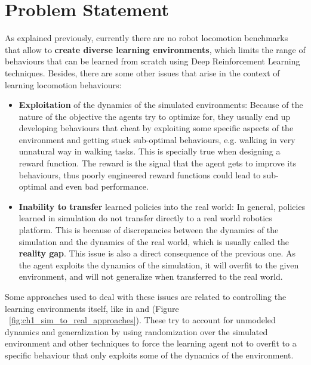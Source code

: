 \section{Problem Statement}
\label{sec:problem}

As explained previously, currently there are no robot locomotion benchmarks that allow
to \textbf{create diverse learning environments}, which limits the range of behaviours that can be learned
from scratch using Deep Reinforcement Learning techniques. Besides, there are some other issues 
that arise in the context of learning locomotion behaviours:

\begin{itemize}
    \item \textbf{Exploitation} of the dynamics of the simulated environments: 
            Because of the nature of the objective the agents try to optimize for, they usually
            end up developing behaviours that cheat by exploiting some specific aspects of the environment
            and getting stuck sub-optimal behaviours, e.g. walking in very unnatural way in walking tasks.
            This is specially true when designing a reward function. The reward is the signal
            that the agent gets to improve its behaviours, thus poorly engineered reward 
            functions could lead to sub-optimal and even bad performance.
    \item \textbf{Inability to transfer} learned  policies into the real world:
            In general, policies learned in simulation do not transfer directly to a real world robotics
            platform. This is because of discrepancies between the dynamics of the simulation and
            the dynamics of the real world, which is usually called the \textbf{reality gap}.
            This issue is also a direct consequence of the previous one. As the agent exploits the 
            dynamics of the simulation, it will overfit to the given environment, and will 
            not generalize when transferred to the real world.
\end{itemize}

Some approaches used to deal with these issues are related to controlling the learning 
environments itself, like in \citeauthor{GoogleBrainSim2Real} and \citeauthor{OpenAISim2real} (Figure ~\ref{fig:ch1_sim_to_real_approaches}).
These try to account for unmodeled dynamics and generalization by using randomization
over the simulated environment and other techniques to force the learning agent not to 
overfit to a specific behaviour that only exploits some of the dynamics of the environment.

